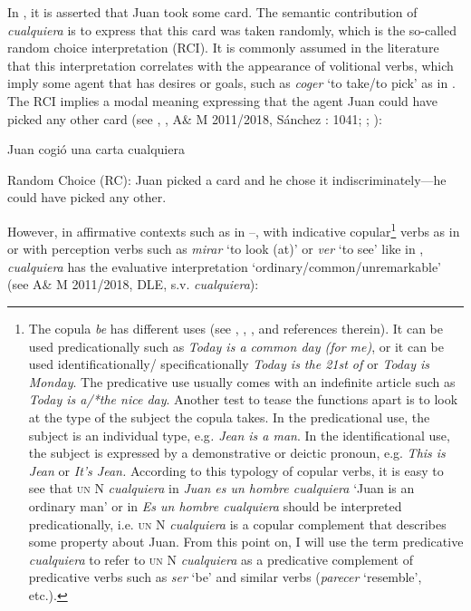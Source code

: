   In , it is asserted that Juan took some card. The semantic contribution of \textit{cualquiera} is to express that this card was taken randomly, which is the so-called random choice interpretation (RCI). It is commonly assumed in the literature that this interpretation correlates with the appearance of volitional verbs, which imply some agent that has desires or goals, such as \textit{coger} ‘to take/to pick’ as in . The RCI implies a modal meaning expressing that the agent Juan could have picked any other card (see \citealt{Menéndez-Benito2005}, \citealt{ChoiRomero2008}, A\& M 2011/2018, Sánchez \citealt{López1999}: 1041; \citealt{Arregui2006}; \citealt{Rivero2011}):

\label{bkm:Ref533761157}  Juan cogió una carta cualquiera

  Random Choice (RC): Juan picked a card and he chose it indiscriminately—he could have picked any other.

  \citep[2]{Menéndez-Benito2005}

However, in affirmative contexts such as in –, with indicative copular\footnote{{The copula} {\textit{be}} {has different uses (see \citealt{Higgins1979}, \citealt{Zamparelli2000}, \citealt{Author2015}, and references therein). It can be used predicationally such as} {\textit{Today is a common day (for me)}}{, or it can be used identificationally/ specificationally} {\textit{Today is the 21st of \citealt{July2010}} }{or}{ \textit{Today is Monday}}{. The predicative use usually comes with an indefinite article such as} {\textit{Today is a/*the nice day}}{. Another test to tease the functions apart is to look at the type of the subject the copula takes. In the predicational use, the subject is an individual type, e.g}{\textit{. Jean is a man}}{. In the identificational use, the subject is expressed by a demonstrative or deictic pronoun, e.g.} {\textit{This is Jean} }{or}{ \textit{It’s Jean.}} {According to this typology of copular verbs, it is easy to see that} \textsc{un} {N}{ \textit{cualquiera}} {in} {\textit{Juan es un hombre cualquiera}} {‘Juan is an ordinary man’ or in} {\textit{Es un hombre cualquiera}} {should be interpreted predicationally, i.e.} \textsc{un} {N}{ \textit{cualquiera}} {is a copular complement that describes some property about Juan. From this point on, I will use the term predicative} {\textit{cualquiera}} {to refer to} \textsc{un} {N} {\textit{cualquiera}} {as a predicative complement of predicative verbs such as} {\textit{ser}} {‘be’ and similar verbs (}{\textit{parecer}} {‘resemble’, etc.).} } verbs as in  or with perception verbs such as \textit{mirar} ‘to look (at)’ or \textit{ver} ‘to see’ like in , \textit{cualquiera} has the evaluative interpretation ‘ordinary/common/unremarkable’ (see A\& M 2011/2018, DLE, s.v. \textit{cualquiera}):

